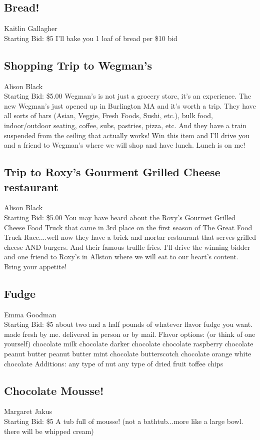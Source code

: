 \documentclass[11pt]{article}
\begin{document}
\subsection{Bread!}
Kaitlin Gallagher
\\
Starting Bid: \$5
\newline
I'll bake you 1 loaf of bread per \$10 bid
\subsection{Shopping Trip to Wegman's}
Alison Black
\\
Starting Bid: \$5.00
\newline
Wegman's is not just a grocery store, it's an experience.  The new Wegman's just opened up in Burlington MA and it's worth a trip.  They have all sorts of bars (Asian, Veggie, Fresh Foods, Sushi, etc.), bulk food, indoor/outdoor seating, coffee, subs, pastries, pizza, etc.  And they have a train suspended from the ceiling that actually works!  Win this item and I'll drive you and a friend to Wegman's where we will shop and have lunch.  Lunch is on me!
\subsection{Trip to Roxy's Gourment Grilled Cheese restaurant}
Alison Black
\\
Starting Bid: \$5.00
\newline
You may have heard about the Roxy's Gourmet Grilled Cheese Food Truck that came in 3rd place on the first season of The Great Food Truck Race....well now they have a brick and mortar restaurant that serves grilled cheese AND burgers.  And their famous truffle fries.  I'll drive the winning bidder and one friend to Roxy's in Allston where we will eat to our heart's content. Bring your appetite!
\subsection{Fudge}
Emma Goodman
\\
Starting Bid: \$5
\newline
about two and a half pounds of whatever flavor fudge you want.  made fresh by me.  delivered in person or by mail.
Flavor options: (or think of one yourself)
chocolate
milk chocolate
darker chocolate
chocolate raspberry
chocolate peanut butter
peanut butter
mint chocolate
butterscotch
chocolate orange
white chocolate
Additions:
any type of nut
any type of dried fruit
toffee chips
\subsection{Chocolate Mousse!}
Margaret Jakus
\\
Starting Bid: \$5
\newline
A tub full of mousse! (not a bathtub...more like a large bowl. there will be whipped cream)
\end{document}
